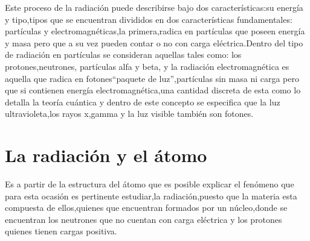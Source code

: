 \documentclass[12pt,fleqn]{book} %
\numberwithin{equation}{section} %
\numberwithin{figure}{section} %
\numberwithin{table}{section} %
\begin{document}
Este proceso de la radiación puede describirse bajo dos características:su energía y tipo,tipos que se encuentran divididos en dos características fundamentales: partículas y electromagnéticas,la primera,radica en partículas que poseen energía y masa pero que a su vez pueden contar o no con carga eléctrica.Dentro del tipo de radiación en partículas se consideran aquellas tales como: los protones,neutrones, partículas alfa y beta, y la radiación electromagnética es aquella que radica en fotones\textquotedblleft paquete de luz\textquotedblright,partículas sin masa ni carga pero que si contienen energía electromagnética,una cantidad discreta de esta como lo detalla la teoría cuántica y dentro de este concepto se especifica que la luz ultravioleta,los rayos x,gamma y la luz visible también son fotones.


\section{La radiación y el átomo }
Es a partir de la estructura del átomo que es posible explicar el fenómeno que para esta ocasión es pertinente estudiar,la radiación,puesto que la materia esta compuesta de ellos,quienes que encuentran formados por un núcleo,donde se encuentran los neutrones que no cuentan con carga eléctrica y los protones quienes tienen cargas positiva.
\end{document}
